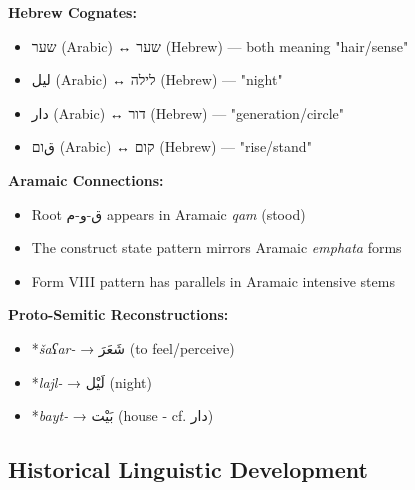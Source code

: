 \documentclass[letter,12pt]{article}
\begin{document}
\begin{tcolorbox}[colback=boxcolor,colframe=dialectcolor,title=\textbf{Semitic Language Connections},breakable]
\textbf{Hebrew Cognates:}
\begin{itemize}
\item \textarabic{שער} (Arabic) ↔ \texthebrew{שער} (Hebrew) — both meaning "hair/sense"
\item \textarabic{ليل} (Arabic) ↔ \texthebrew{לילה} (Hebrew) — "night"
\item \textarabic{دار} (Arabic) ↔ \texthebrew{דור} (Hebrew) — "generation/circle"
\item \textarabic{قום} (Arabic) ↔ \texthebrew{קום} (Hebrew) — "rise/stand"
\end{itemize}

\textbf{Aramaic Connections:}
\begin{itemize}
\item Root \textarabic{ق-و-م} appears in Aramaic \textit{qam} (stood)
\item The construct state pattern mirrors Aramaic \textit{emphata} forms
\item Form VIII pattern has parallels in Aramaic intensive stems
\end{itemize}

\textbf{Proto-Semitic Reconstructions:}
\begin{itemize}
\item *\textit{šaʕar-} → \textarabic{شَعَرَ} (to feel/perceive)
\item *\textit{lajl-} → \textarabic{لَيْل} (night)
\item *\textit{bayt-} → \textarabic{بَيْت} (house - cf. \textarabic{دار})
\end{itemize}
\end{tcolorbox}

\subsection{Historical Linguistic Development}
\end{document}
